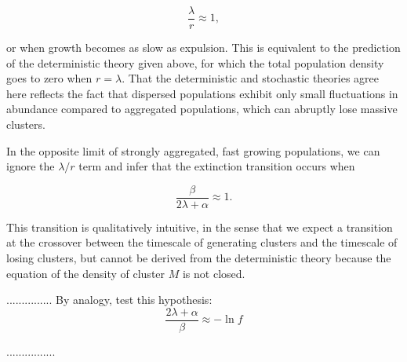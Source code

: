 \documentclass[12pt]{article}
\def\be{\begin{equation}}
\def\ee{\end{equation}}
\begin{document}
\be
\frac{\lambda}{r} \approx 1,
\ee

\noindent or when growth becomes as slow as expulsion. This is equivalent to the prediction of the deterministic theory given above, for which the total population density goes to zero when $r = \lambda$.  That the deterministic and stochastic theories agree here reflects the fact that dispersed populations exhibit only small fluctuations in abundance compared to aggregated populations, which can abruptly lose massive clusters.

In the opposite limit of strongly aggregated, fast growing populations, we can ignore the $\lambda/r$ term and infer that the extinction transition occurs when  

\be
	\frac{\beta}{2\lambda + \alpha} \approx 1.
\ee

\noindent This transition is qualitatively intuitive, in the sense that we expect a transition at the crossover between the timescale of generating clusters and the timescale of losing clusters, but cannot be derived from the deterministic theory because the equation of the density of cluster $M$ is not closed.

...............
By analogy, test this hypothesis:
\be
\frac{2\lambda + \alpha}{\beta} \approx -\ln f
\ee


................
\end{document}

